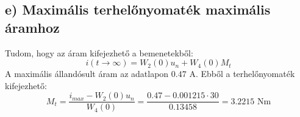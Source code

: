 \subsection{e) Maximális terhelőnyomaték maximális áramhoz}
Tudom, hogy az áram kifejezhető a bemenetekből:
\begin{equation}
    i(t \to \infty) = W_2(0) u_n + W_4(0) M_t
\end{equation}
A maximális állandósult áram az adatlapon $0.47$ A. Ebből a terhelőnyomaték kifejezhető:
\begin{equation}
    M_t = \frac{i_{max} - W_2(0) u_n}{W_4(0)} = \frac{0.47 - 0.001215 \cdot 30}{0.13458} = 3.2215 \text{ Nm}
\end{equation}

